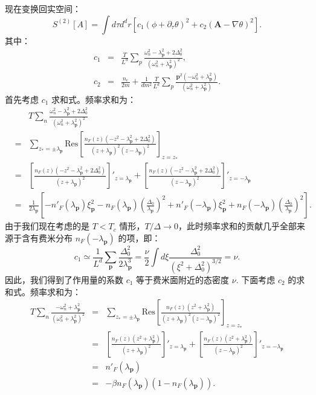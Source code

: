 \documentclass[10pt,UTF8]{ctexart}
\begin{document}
现在变换回实空间：
\begin{equation}
	S^{(2)}[A] = \int d\tau d^d r \left[c_1 (\phi+\partial_\tau \theta)^2+c_2 (\bm A - \nabla \theta)^2 \right].
\end{equation}
其中：
\begin{eqnarray}
	c_1 &=& \frac{T}{L^d}\sum_p \frac{\omega_n^2-\lambda_{\bm p}^2+2\Delta_0^2}{(\omega_n^2+\lambda_{\bm p}^2)^2}, \\
	c_2 &=& \frac{n_e}{2m}+\frac{1}{dm^2}\frac{T}{L^d}\sum_p \frac{\bm p^2 (-\omega_n^2+\lambda_{\bm p}^2)}{(\omega_n^2+\lambda_{\bm p}^2)}.
\end{eqnarray}
首先考虑 $c_1$ 求和式。频率求和为：
\begin{eqnarray}
	& & T \sum_n \frac{\omega_n^2-\lambda_{\bm p}^2+2\Delta_0^2}{(\omega_n^2+\lambda_{\bm p}^2)^2} \nonumber \\
	&=& \sum_{z_*=\pm \lambda_{\bm p}} \mathrm{Res} \left[ \frac{n_F(z)(-z^2-\lambda_{\bm p}^2+2\Delta_0^2)}{(z+\lambda_{\bm p})^2(z-\lambda_{\bm p})^2} \right]_{z=z_*} \nonumber \\
	&=& \left[ \frac{n_F(z)(-z^2-\lambda_{\bm p}^2+2\Delta_0^2)}{(z+\lambda_{\bm p})^2} \right]'_{z=\lambda_{\bm p}} + \left[ \frac{n_F(z)(-z^2-\lambda_{\bm p}^2+2\Delta_0^2)}{(z-\lambda_{\bm p})^2} \right]'_{z=-\lambda_{\bm p}} \nonumber \\
	&=& \frac{1}{2\lambda_{\bm p}}\left[
	-n'_F(\lambda_{\bm p}) \xi_{\bm p}^2
	-n_F(\lambda_{\bm p})\left(\frac{\Delta_0}{\lambda_{\bm p}}\right)^2 
	+n'_F(-\lambda_{\bm p}) \xi_{\bm p}^2
	+n_F(-\lambda_{\bm p})\left(\frac{\Delta_0}{\lambda_{\bm p}}\right)^2 
	\right].
\end{eqnarray}
由于我们现在考虑的是 $T < T_c$ 情形，$ T/\Delta \rightarrow 0$，此时频率求和的贡献几乎全部来源于含有费米分布 $n_F(-\lambda_{\bm p})$ 的项，即：
\begin{equation}
	c_1 \simeq \frac{1}{L^d} \sum_{\bm p} \frac{\Delta_0^2}{2\lambda_{\bm p}^3}
	= \frac{\nu}{2} \int d\xi \frac{\Delta_0^2}{(\xi^2+\Delta_0^2)^{3/2}}
	= \nu.
\end{equation}
因此，我们得到了作用量的系数 $c_1$ 等于费米面附近的态密度 $\nu$. 下面考虑 $c_2$ 的求和式。频率求和为：
\begin{eqnarray}
	T \sum_n \frac{-\omega_n^2+\lambda_{\bm p}^2}{(\omega_n^2+\lambda_{\bm p}^2)^2}
	&=& \sum_{z_*=\pm \lambda_{\bm p}} \mathrm{Res} \left[ \frac{n_F(z)(z^2+\lambda_{\bm p}^2)}{(z+\lambda_{\bm p})^2(z-\lambda_{\bm p})^2}\right]_{z=z_*} \nonumber \\
	&=& \left[ \frac{n_F(z)(z^2+\lambda_{\bm p}^2)}{(z+\lambda_{\bm p})^2}\right]'_{z=\lambda_{\bm p}} + \left[ \frac{n_F(z)(z^2+\lambda_{\bm p}^2)}{(z-\lambda_{\bm p})^2}\right]'_{z=-\lambda_{\bm p}} \nonumber \\
	&=& n'_F(\lambda_{\bm p}) \nonumber \\
	&=& -\beta n_F(\lambda_{\bm p})(1-n_F(\lambda_{\bm p})).
\end{eqnarray}
\end{document}
